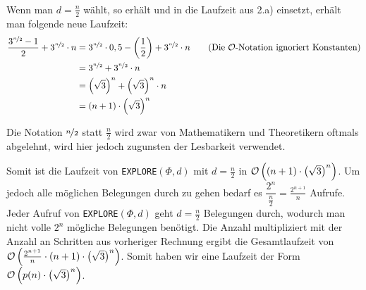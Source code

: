 \documentclass[a4paper]{article}
\newcommand{\explore}{\texttt{EXPLORE$(\Phi, d)$}\xspace}
\begin{document}
	\subsubsection{}
	Wenn man $d=\frac{n}{2}$ wählt, so erhält und in die Laufzeit aus 2.a) einsetzt, erhält man folgende neue Laufzeit:
	\begin{align*}
			\frac{3^{\nicefrac{n}{2}}-1}{2}+3^{\nicefrac{n}{2}}\cdot n
		&=	3^{\nicefrac{n}{2}}\cdot 0,5- \left(\frac{1}{2}\right)+3^{\nicefrac{n}{2}}\cdot n
			\tag{Die $\mathcal{O}$-Notation ignoriert Konstanten}\\
		&=	3^{\nicefrac{n}{2}}+3^{\nicefrac{n}{2}}\cdot n\\
		&=	\left(\sqrt{3}\right)^n+\left(\sqrt{3}\right)^n\cdot n\\
		&=	(n+1)\cdot \left(\sqrt{3}\right)^n
	\end{align*}
	\vspace{-2ex}
	\begin{note}
	Die Notation $\nicefrac{n}{2}$ statt $\frac{n}{2}$ wird zwar von Mathematikern und Theoretikern oftmals abgelehnt, wird hier jedoch zugunsten der Lesbarkeit verwendet.
	\end{note}
	Somit ist die Laufzeit von \explore mit $d=\frac{n}{2}$ in $\mathcal{O}\left((n+1)\cdot \left(\sqrt{3}\right)^n\right)$.\n
	Um jedoch alle möglichen Belegungen durch zu gehen bedarf es $\dfrac{2^n}{\frac{n}{2}}=\frac{2^{n+1}}{n}$ Aufrufe. Jeder Aufruf von \explore geht $d=\frac{n}{2}$ Belegungen durch, wodurch man nicht volle $2^n$ mögliche Belegungen benötigt.\n
	Die Anzahl multipliziert mit der Anzahl an Schritten aus vorheriger Rechnung ergibt die Gesamtlaufzeit von $\mathcal{O}\left(\frac{2^{n+1}}{n}\cdot (n+1)\cdot \left(\sqrt{3}\right)^n\right)$.\n
	Somit haben wir eine Laufzeit der Form $\mathcal{O}\left(p(n)\cdot \left(\sqrt{3}\right)^n\right)$.
\end{document}
